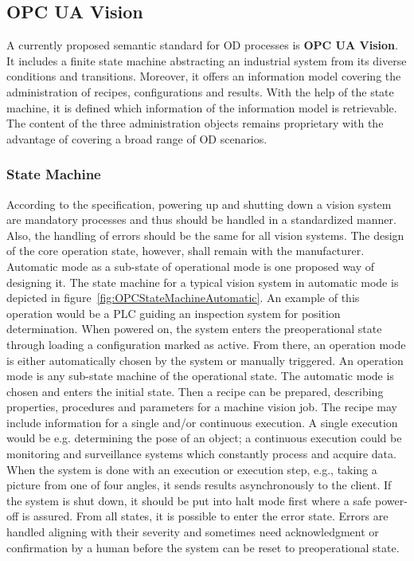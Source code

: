 \subsection{OPC UA Vision}
A currently proposed semantic standard for OD processes is \textbf{OPC UA Vision}. It includes a finite state machine abstracting an industrial system from its diverse conditions and transitions. Moreover, it offers an information model covering the administration of recipes, configurations and results. With the help of the state machine, it is defined which information of the information model is retrievable. The content of the three administration objects remains proprietary with the advantage of covering a broad range of OD scenarios.

\subsubsection{State Machine}
According to the specification, powering up and shutting down a vision system are mandatory processes and thus should be handled in a standardized manner. Also, the handling of errors should be the same for all vision systems. The design of the core operation state, however, shall remain with the manufacturer. Automatic mode as a sub-state of operational mode is one proposed way of designing it. The state machine for a typical vision system in automatic mode is depicted in figure~\ref{fig:OPCStateMachineAutomatic}. An example of this operation would be a PLC guiding an inspection system for position determination. When powered on, the system enters the preoperational state through loading a configuration marked as active. From there, an operation mode is either automatically chosen by the system or manually triggered. An operation mode is any sub-state machine of the operational state. The automatic mode is chosen and enters the initial state. Then a recipe can be prepared, describing properties, procedures and parameters for a machine vision job. The recipe may include information for a single and/or continuous execution. A single execution would be e.g. determining the pose of an object; a continuous execution could be monitoring and surveillance systems which constantly process and acquire data. When the system is done with an execution or execution step, e.g., taking a picture from one of four angles, it sends results asynchronously to the client. If the system is shut down, it should be put into halt mode first where a safe power-off is assured. From all states, it is possible to enter the error state. Errors are handled aligning with their severity and sometimes need acknowledgment or confirmation by a human before the system can be reset to preoperational state.

